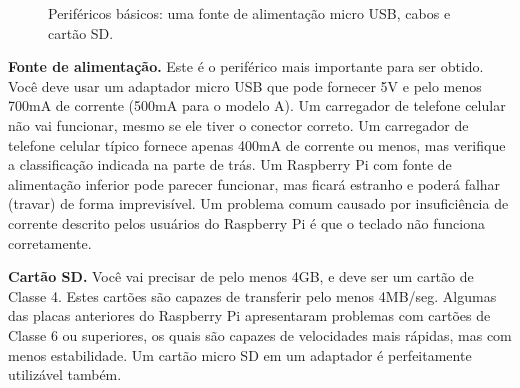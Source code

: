\begin{figure}[ht]
    \centering
    \caption{Periféricos básicos: uma fonte de alimentação micro USB, cabos e cartão SD.}
\end{figure}

\textbf{Fonte de alimentação.} Este é o periférico mais importante para ser obtido. Você deve usar um adaptador micro USB que pode fornecer 5V e pelo menos 700mA de corrente (500mA para o modelo A). Um carregador de telefone celular não vai funcionar, mesmo se ele tiver o conector correto. Um carregador de telefone celular típico fornece apenas 400mA de corrente ou menos, mas verifique a classificação indicada na parte de trás. Um Raspberry Pi com fonte de alimentação inferior pode parecer funcionar, mas ficará estranho e poderá falhar (travar) de forma imprevisível. Um problema comum causado por insuficiência de corrente descrito pelos usuários do Raspberry Pi é que o teclado não funciona corretamente.

\textbf{Cartão SD.} Você vai precisar de pelo menos 4GB, e deve ser um cartão de Classe 4. Estes cartões são capazes de transferir pelo menos 4MB/seg. Algumas das placas anteriores do Raspberry Pi apresentaram problemas com cartões de Classe 6 ou superiores, os quais são capazes de velocidades mais rápidas, mas com menos estabilidade. Um cartão micro SD em um adaptador é perfeitamente utilizável também.

